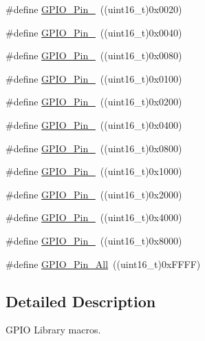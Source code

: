 \begin{DoxyCompactItemize}
\item 
\#define \hyperlink{group___t_m___g_p_i_o___macros_ga32dbe930f52ce5ab60190c65e9dc741e}{G\+P\+I\+O\+\_\+\+Pin\+\_}~((uint16\+\_\+t)0x0020)
\item 
\#define \hyperlink{group___t_m___g_p_i_o___macros_gaf047899d873f27c2db9f50b342e35a58}{G\+P\+I\+O\+\_\+\+Pin\+\_}~((uint16\+\_\+t)0x0040)
\item 
\#define \hyperlink{group___t_m___g_p_i_o___macros_ga7346b6ce5507bd28a7a79e7dcc816c08}{G\+P\+I\+O\+\_\+\+Pin\+\_}~((uint16\+\_\+t)0x0080)
\item 
\#define \hyperlink{group___t_m___g_p_i_o___macros_gac891f0984dc64af3567577fbf13ab304}{G\+P\+I\+O\+\_\+\+Pin\+\_}~((uint16\+\_\+t)0x0100)
\item 
\#define \hyperlink{group___t_m___g_p_i_o___macros_gaad1891082d5d6bcac06c2729a9fdd2f0}{G\+P\+I\+O\+\_\+\+Pin\+\_}~((uint16\+\_\+t)0x0200)
\item 
\#define \hyperlink{group___t_m___g_p_i_o___macros_ga726af6407ba60ac60f02057227c2d348}{G\+P\+I\+O\+\_\+\+Pin\+\_}~((uint16\+\_\+t)0x0400)
\item 
\#define \hyperlink{group___t_m___g_p_i_o___macros_ga5139d5bc3d15784ae7794ed2ae1ff767}{G\+P\+I\+O\+\_\+\+Pin\+\_}~((uint16\+\_\+t)0x0800)
\item 
\#define \hyperlink{group___t_m___g_p_i_o___macros_gada91257dcaab2c86f75fbd8e4b52b98c}{G\+P\+I\+O\+\_\+\+Pin\+\_}~((uint16\+\_\+t)0x1000)
\item 
\#define \hyperlink{group___t_m___g_p_i_o___macros_ga4155a41c433f3657b9c79cfbd4240966}{G\+P\+I\+O\+\_\+\+Pin\+\_}~((uint16\+\_\+t)0x2000)
\item 
\#define \hyperlink{group___t_m___g_p_i_o___macros_ga21cd1d89c0c061a6f09c5a842610bee5}{G\+P\+I\+O\+\_\+\+Pin\+\_}~((uint16\+\_\+t)0x4000)
\item 
\#define \hyperlink{group___t_m___g_p_i_o___macros_gae686a9fc47cf3e420e5db0784210711d}{G\+P\+I\+O\+\_\+\+Pin\+\_}~((uint16\+\_\+t)0x8000)
\item 
\#define \hyperlink{group___t_m___g_p_i_o___macros_gaba3e915ddca17a1211edc07b7fd97e8b}{G\+P\+I\+O\+\_\+\+Pin\+\_\+\+All}~((uint16\+\_\+t)0x\+F\+F\+F\+F)
\end{DoxyCompactItemize}


\subsection{Detailed Description}
G\+P\+IO Library macros. 



